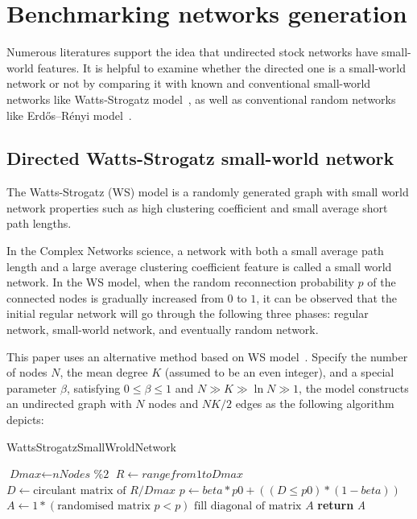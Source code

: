 \chapter{Benchmarking networks generation}
Numerous literatures support the idea that undirected stock networks have small-world features. It is helpful to examine whether the directed one is a small-world network or not by comparing it with known and conventional small-world networks like Watts-Strogatz model~\cite{watts1998collective}, as well as conventional random networks like Erdős–Rényi model~\cite{random}.

\section{Directed Watts-Strogatz small-world network}
The Watts-Strogatz (WS) model is a randomly generated graph with small world network properties such as high clustering coefficient and small average short path lengths.

In the Complex Networks science, a network with both a small average path length and a large average clustering coefficient feature is called a small world network. In the WS model, when the random reconnection probability $p$ of the connected nodes is gradually increased from $0$ to $1$, it can be observed that the initial regular network will go through the following three phases: regular network, small-world network, and eventually random network.

This paper uses an alternative method based on WS model~\cite{song2014simple}. Specify the number of nodes $N$, the mean degree $K$ (assumed to be an even integer), and a special parameter $\beta$, satisfying $0\leq \beta \leq 1$ and $N\gg K\gg \ln N\gg 1$, the model constructs an undirected graph with $N$ nodes and ${NK}/{2}$ edges as the following algorithm depicts:

\begin{algorithm}[H]
	\caption{WattsStrogatzSmallWroldNetwork}\label{alg:smallworld}
	\begin{algorithmic}[1]
		\State $\textit{Dmax} \gets \textit{nNodes \% 2}$
		\State $\textit{R} \gets range from 1 to \textit{Dmax}$
		\State $\textit{D} \gets \text{circulant matrix of } \textit{R}/\textit{Dmax}$
		\State $\textit{p} \gets \textit{beta}*\textit{p0}+((\textit{D} \leq \textit{p0})*(1-\textit{beta}))$
		\State $\textit{A} \gets 1*(\text{randomised matrix }\textit{p} < p)$
		\State $\text{fill diagonal of matrix }\textit{A}$
		\State \textbf{return} {\textit{A}}
		\EndProcedure
	\end{algorithmic}
\end{algorithm}

